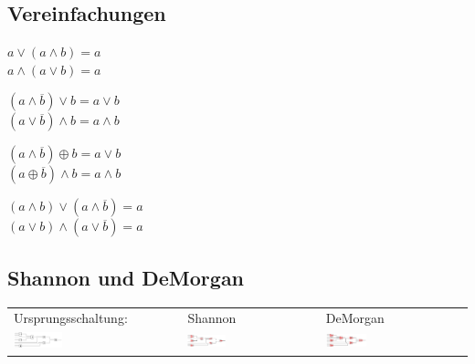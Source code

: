 \subsection{Vereinfachungen}
	\begin{multicols}{4}
		$ a \vee (a \wedge b) = a $ \\
		$ a \wedge (a \vee b) = a $ 
	\columnbreak
	
		$ (a \wedge \overline{b}) \vee b = a \vee b $ \\
		$ (a \vee \overline{b}) \wedge b = a \wedge b $ 
	\columnbreak
	
		$ (a \wedge \overline{b}) \oplus b = a \vee b $ \\
		$ (a \oplus \overline{b}) \wedge b = a \wedge b $ 
	\columnbreak
		
		$ (a \wedge b) \vee (a \wedge \overline{b}) = a $\\	
		$ (a \vee b) \wedge (a \vee \overline{b}) = a $
	\end{multicols}

\subsection{Shannon und DeMorgan}
	\begin{tabular}{lll}
		Ursprungsschaltung: & Shannon & DeMorgan\\
		\includegraphics[width=0.3\textwidth]{pics/shanonursprung} & 
		\includegraphics[width=0.3\textwidth]{pics/shanonende} &
		\includegraphics[width=0.3\textwidth]{pics/demorganende}\\
	\end{tabular}


